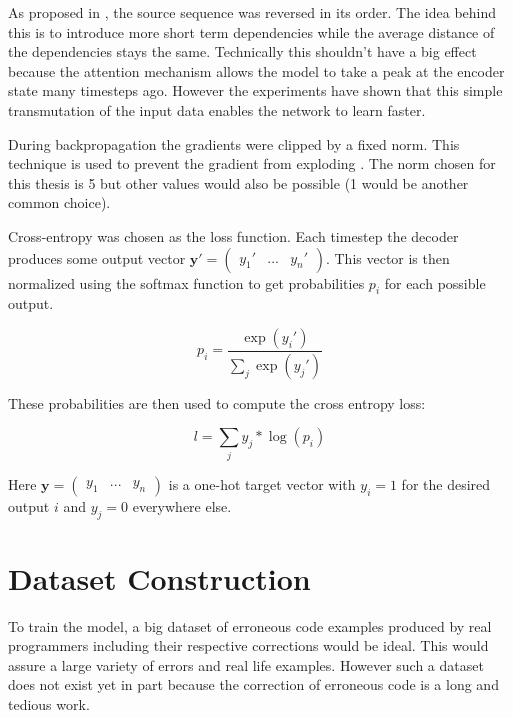 As proposed in \cite{seq2seq}, the source sequence was reversed in its order. The idea behind this is to introduce more short term dependencies while the average distance of the dependencies stays the same. Technically this shouldn't have a big effect because the attention mechanism allows the model to take a peak at the encoder state many timesteps ago. However the experiments have shown that this simple transmutation of the input data enables the network to learn faster.

 During backpropagation the gradients were clipped by a fixed norm. This technique is used to prevent the gradient from exploding \cite{gradient_clipping}. The norm chosen for this thesis is 5 but other values would also be possible (1 would be another common choice).

 Cross-entropy was chosen as the loss function. Each timestep the decoder produces some output vector \(\mathbf{y}' = \begin{pmatrix} y_1' & ... & y_n'\end{pmatrix}\). This vector is then normalized using the softmax function to get probabilities \(p_i\) for each possible output.

 \begin{equation*}
   p_i = \frac
             {\exp(y_i')}
             {\sum_{j} \exp(y_j')}
 \end{equation*}

 These probabilities are then used to compute the cross entropy loss:

 \begin{equation*}
   l = \sum_{j} y_j * \log(p_i)
 \end{equation*}

 Here \(\mathbf{y} = \begin{pmatrix} y_1 & ... & y_n \end{pmatrix}\) is a one-hot target vector with \(y_i = 1\) for the desired output \(i\) and \(y_j = 0\) everywhere else.

\section{Dataset Construction}

To train the model, a big dataset of erroneous code examples produced by real programmers including their respective corrections would be ideal. This would assure a large variety of errors and real life examples. However such a dataset does not exist yet in part because the correction of erroneous code is a long and tedious work.


